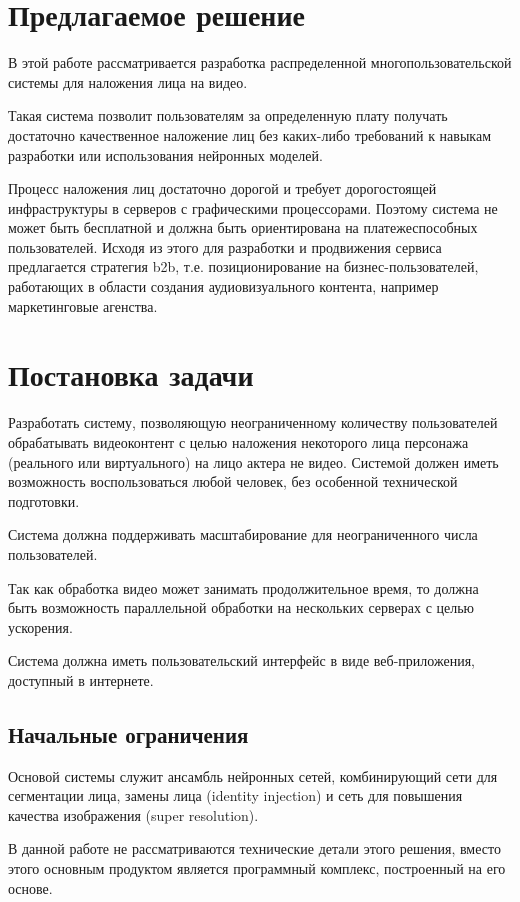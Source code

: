 \section{Предлагаемое решение}

В этой работе рассматривается разработка распределенной многопользовательской системы для наложения лица на видео.

Такая система позволит пользователям за определенную плату получать достаточно качественное наложение лиц без каких-либо требований к навыкам разработки или использования нейронных моделей. 

Процесс наложения лиц достаточно дорогой и требует дорогостоящей инфраструктуры в серверов с графическими процессорами. Поэтому система не может быть бесплатной и должна быть ориентирована на платежеспособных пользователей. Исходя из этого для разработки и продвижения сервиса предлагается стратегия b2b, т.е. позиционирование на бизнес-пользователей, работающих в области создания аудиовизуального контента, например маркетинговые агенства.

\section{Постановка задачи}

Разработать систему, позволяющую неограниченному количеству пользователей обрабатывать видеоконтент с целью наложения некоторого лица персонажа (реального или виртуального) на лицо актера не видео. Системой должен иметь возможность воспользоваться любой человек, без особенной технической подготовки.

Система должна поддерживать масштабирование для неограниченного числа пользователей.

Так как обработка видео может занимать продолжительное время, то должна быть возможность параллельной обработки на нескольких серверах с целью ускорения.

Система должна иметь пользовательский интерфейс в виде веб-приложения, доступный в интернете.

\subsection{Начальные ограничения}

Основой системы служит ансамбль нейронных сетей, комбинирующий сети для сегментации лица, замены лица (identity injection) и сеть для повышения качества изображения (super resolution).

В данной работе не рассматриваются технические детали этого решения, вместо этого основным продуктом является программный комплекс, построенный на его основе.

